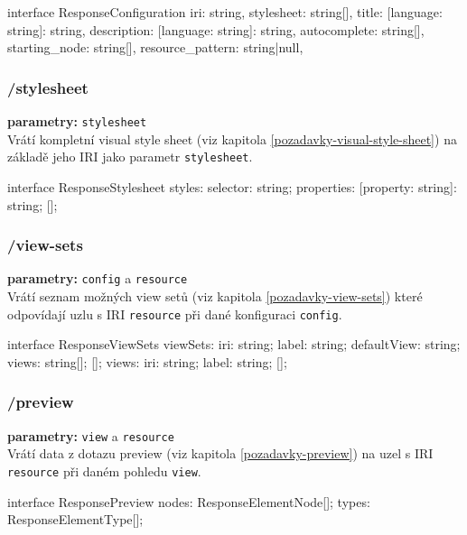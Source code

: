 \begin{code}
interface ResponseConfiguration {
    iri: string,
    stylesheet: string[],
    title: {[language: string]: string},
    description: {[language: string]: string},
    autocomplete: string[],
    starting_node: string[],
    resource_pattern: string|null,
}
\end{code}

\subsubsection{/stylesheet}
\textbf{parametry:} \texttt{stylesheet} \\
Vrátí kompletní visual style sheet (viz kapitola \ref{pozadavky-visual-style-sheet}) na základě jeho IRI jako parametr \texttt{stylesheet}.

\begin{code}
interface ResponseStylesheet {
    styles: {
        selector: string;
        properties: {
            [property: string]: string;
        }
    }[];
}
\end{code}

\subsubsection{/view-sets}
\textbf{parametry:} \texttt{config} a \texttt{resource} \\
Vrátí seznam možných view setů (viz kapitola \ref{pozadavky-view-sets}) které odpovídají uzlu s IRI \texttt{resource} při dané konfiguraci \texttt{config}.

\begin{code}
interface ResponseViewSets {
    viewSets: {
        iri: string;
        label: string;
        defaultView: string;
        views: string[];
    }[];
    views: {
        iri: string;
        label: string;
    }[];
}
\end{code}

\subsubsection{/preview}
\textbf{parametry:} \texttt{view} a \texttt{resource} \\
Vrátí data z dotazu preview (viz kapitola \ref{pozadavky-preview}) na uzel s IRI \texttt{resource} při daném pohledu \texttt{view}.

\begin{code}
interface ResponsePreview {
    nodes: ResponseElementNode[];
    types: ResponseElementType[];
}
\end{code}

